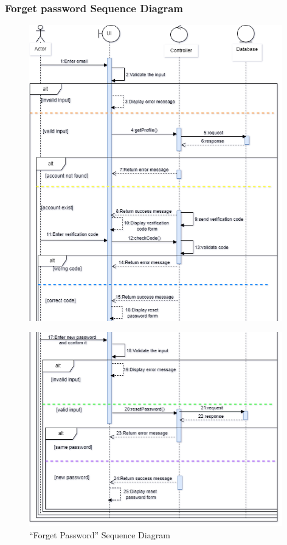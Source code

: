 \subsubsection{Forget password  Sequence Diagram}
\begin{figure}[H]
\includegraphics[width=0.98\textwidth]{images/chap2/resetPassword_cp1.png}
    \label{fig:enter-label}    
\end{figure}
\begin{figure}[H]
\includegraphics[width=0.98\textwidth]{images/chap2/resetPassword_cp2.png}
    \caption{“Forget Password” Sequence Diagram}
    \label{fig:enter-label}    
\end{figure}
